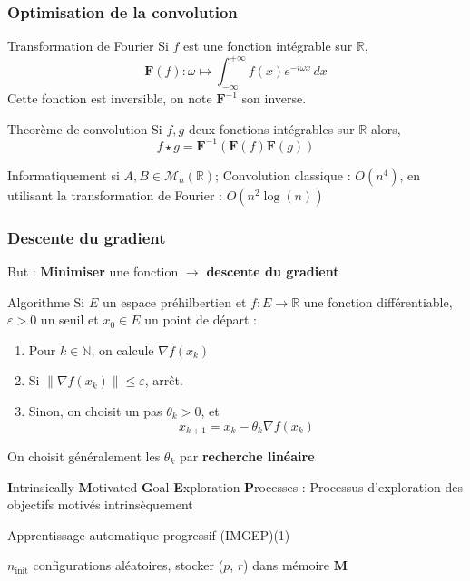 \documentclass[aspectratio=43]{beamer}
\begin{document}
\begin{frame}
	\frametitle{Optimisation de la convolution}

	\begin{block}{Transformation de Fourier}
		Si $f$ est une fonction int\'egrable sur $\mathbb{R}$,
		\[
			\mathbf{F}(f) \colon \omega \mapsto \int_{-\infty}^{+\infty} f(x)e^{-i \omega x}\,dx
		\]
		Cette fonction est inversible, on note $\mathbf{F}^{-1}$ son inverse.
	\end{block}
	\begin{alertblock}{Theor\`eme de convolution}
		Si $f, g$ deux fonctions int\'egrables sur $\mathbb{R}$ alors,
		\[
			f \star g = \mathbf{F}^{-1}(\mathbf{F}(f)\mathbf{F}(g))
		\] \end{alertblock}

	Informatiquement si $A, B \in \mathcal{M}_n(\mathbb{R})$; Convolution classique : $O(n^4)$, en utilisant
	la transformation de Fourier : $O(n^2\log(n))$
\end{frame}

\begin{frame}
	\frametitle{Descente du gradient}
	But : \textbf{Minimiser} une fonction $\rightarrow$ \textbf{descente du gradient}
	\begin{alertblock}{Algorithme}
		Si $E$ un espace pr\'ehilbertien et $f : E \rightarrow \mathbb{R}$ une fonction diff\'erentiable, $\varepsilon > 0$ un seuil et $x_0 \in E$ un point de d\'epart :
		\begin{enumerate}
			\item Pour $k \in \mathbb{N}$, on calcule $\nabla f(x_k)$
			\item Si $\lVert \nabla f(x_k) \rVert \leqslant \varepsilon$, arr\^et.
			\item Sinon, on choisit un pas $\theta_k > 0$, et $$x_{k + 1} = x_k - \theta_k \nabla f(x_k)$$
		\end{enumerate}	
	\end{alertblock}
	On choisit g\'en\'eralement les $\theta_k$ par \textbf{recherche lin\'eaire}
\end{frame}
\begin{frame}
	\begin{center}
		\small\textbf{I}ntrinsically \textbf{M}otivated \textbf{G}oal \textbf{E}xploration \textbf{P}rocesses : Processus d'exploration des objectifs motivés intrinsèquement
	\end{center}
	\begin{alertblock}{Apprentissage automatique progressif (IMGEP)(1)}
		\begin{algorithm}[H]
			$n_\text{init}$ configurations al\'eatoires, stocker ($p$, $r$) dans m\'emoire $\mathbf{M}$\;
		\end{algorithm}	
	\end{alertblock}
\end{frame}
\end{document}
